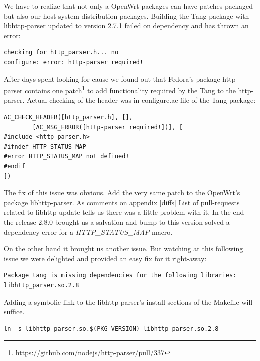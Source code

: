 We have to realize that not only a OpenWrt packages can have patches packaged but also our host system distribution packages.
Building the Tang package with libhttp-parser updated to version 2.7.1 failed on dependency and has thrown an error:
\begin{lstlisting}[columns=fixed,basicstyle=\ttfamily\footnotesize,tabsize=4,backgroundcolor=\color{yellow!10}]
checking for http_parser.h... no
configure: error: http-parser required!
\end{lstlisting}
After days spent looking for cause we found out that Fedora's package http-parser contains one patch\footnote{https://github.com/nodejs/http-parser/pull/337} to add functionality required by the Tang to the http-parser.
Actual checking of the header was in configure.ac file of the Tang package:
\begin{lstlisting}[columns=fixed,basicstyle=\ttfamily\footnotesize,tabsize=4,backgroundcolor=\color{yellow!10}]
AC_CHECK_HEADER([http_parser.h], [],
		[AC_MSG_ERROR([http-parser required!])], [
#include <http_parser.h>
#ifndef HTTP_STATUS_MAP
#error HTTP_STATUS_MAP not defined!
#endif
])
\end{lstlisting}
The fix of this issue was obvious.
Add the very same patch to the OpenWrt's package libhttp-parser.
As comments on appendix \ref{diffs} List of pull-requests related to libhttp-update tells us there was a little problem with it.
In the end the release 2.8.0 brought us a salvation and bump to this version solved a dependency error for a {\it HTTP\_STATUS\_MAP} macro.

On the other hand it brought us another issue.
But watching at this following issue we were delighted and provided an easy fix for it right-away:
\begin{lstlisting}[columns=fixed,basicstyle=\ttfamily\footnotesize,tabsize=4,backgroundcolor=\color{yellow!10}]
Package tang is missing dependencies for the following libraries:
libhttp_parser.so.2.8
\end{lstlisting}
Adding a symbolic link to the libhttp-parser's install sections of the Makefile will suffice.
\begin{lstlisting}[columns=fixed,basicstyle=\ttfamily\footnotesize,tabsize=4,backgroundcolor=\color{yellow!10}]
ln -s libhttp_parser.so.$(PKG_VERSION) libhttp_parser.so.2.8
\end{lstlisting}
